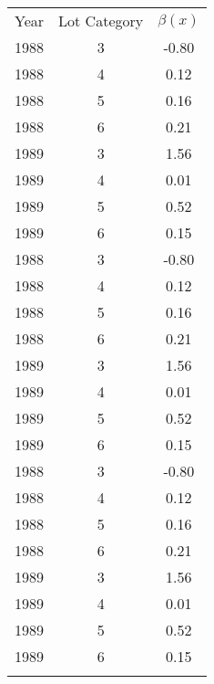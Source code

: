 \begin{center}
\begin{tabular}{ccc}
\hline \noalign{\smallskip}Year & Lot Category & $\beta(x)$\\
\noalign{\smallskip}\hline \noalign{\smallskip}1988 & 3 & -0.80\\
1988 & 4 & 0.12\\
1988 & 5 & 0.16\\
1988 & 6 & 0.21\\
1989 & 3 & 1.56\\
1989 & 4 & 0.01\\
1989 & 5 & 0.52\\
1989 & 6 & 0.15\\
1988 & 3 & -0.80\\
1988 & 4 & 0.12\\
1988 & 5 & 0.16\\
1988 & 6 & 0.21\\
1989 & 3 & 1.56\\
1989 & 4 & 0.01\\
1989 & 5 & 0.52\\
1989 & 6 & 0.15\\
1988 & 3 & -0.80\\
1988 & 4 & 0.12\\
1988 & 5 & 0.16\\
1988 & 6 & 0.21\\
1989 & 3 & 1.56\\
1989 & 4 & 0.01\\
1989 & 5 & 0.52\\
1989 & 6 & 0.15\\
\noalign{\smallskip}\hline\end{tabular}\\
\end{center}
